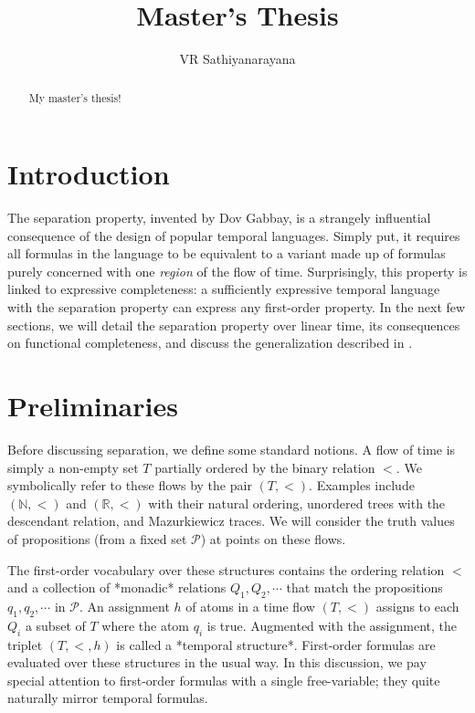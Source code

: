 \documentclass[a4paper,UKenglish,cleveref, autoref, thm-restate]{lipics-v2021}
\title{Master's Thesis} %
\author{VR Sathiyanarayana}{Chennai Mathematical Institute, India \and \url{http://sathiyavrs.netlify.com} }{sathiyanarayana@cmi.ac.in}{}{}%
\begin{document}
\maketitle

\begin{abstract}
My master's thesis!
\end{abstract}

\section{Introduction}
\label{sec:introduction}

The separation property, invented by Dov Gabbay, is a strangely influential consequence of the design of popular temporal languages. Simply put, it requires all formulas in the language to be equivalent to a variant made up of formulas purely concerned with one \textit{region} of the flow of time. Surprisingly, this property is linked to expressive completeness: a sufficiently expressive temporal language with the separation property can express any first-order property. In the next few sections, we will detail the separation property over linear time, its consequences on functional completeness, and discuss the generalization described in \cite{gabbay1994}.

\section{Preliminaries}

Before discussing separation, we define some standard notions. A flow of time is simply a non-empty set $T$ partially ordered by the binary relation $<$. We symbolically refer to these flows by the pair $(T, <)$. Examples include $(\mathbb{N}, <)$ and $(\mathbb{R}, <)$ with their natural ordering, unordered trees with the descendant relation, and Mazurkiewicz traces. We will consider the truth values of propositions (from a fixed set $\mathcal{P}$) at points on these flows.

The first-order vocabulary over these structures contains the ordering relation $<$ and a collection of *monadic* relations $Q_1, Q_2, \cdots$ that match the propositions $q_1, q_2, \cdots$ in $\mathcal{P}$. An assignment $h$ of atoms in a time flow $(T, <)$ assigns to each $Q_i$ a subset of $T$ where the atom $q_i$ is true. Augmented with the assignment, the triplet $(T, <, h)$ is called a *temporal structure*. First-order formulas are evaluated over these structures in the usual way. In this discussion, we pay special attention to first-order formulas with a single free-variable; they quite naturally mirror temporal formulas.
\end{document}
